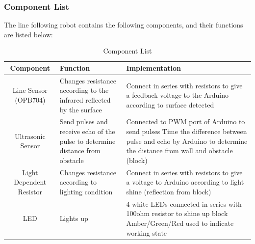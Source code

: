 \documentclass{article}
\begin{document}
\subsubsection{Component List}
The line following robot contains the following components, and their functions are listed below:
\begin{table}[]
    \centering
    \begin{tabular}{|c|p{5cm}|p{5cm}|}
\hline
Component &
  Function &
  Implementation
   \\
   \hline
Line Sensor (OPB704) &
  Changes resistance according to the infrared reflected by the surface &
  Connect in series with resistors to give a feedback voltage to the Arduino according to surface detected
   \\
   \hline
Ultrasonic Sensor &
  Send pulses and receive echo of the pulse to determine distance from obstacle &
Connected to PWM port of Arduino to send pulses  Time the difference between pulse and echo by Arduino to determine the distance from wall and obstacle (block)
   \\
   \hline
Light Dependent Resistor &
  Changes resistance according to lighting condition &
  Connect in series with resistors   to give a voltage to Arduino according to light shine (reflection from block) 
   \\
   \hline
LED &
  Lights up &
4 white LEDs connected in series with 100ohm resistor to shine up block Amber/Green/Red used to indicate   working state\\
  \hline
    \end{tabular}
    \caption{Component List}
    \label{tab:mount_sens}
\end{table}
\end{document}
